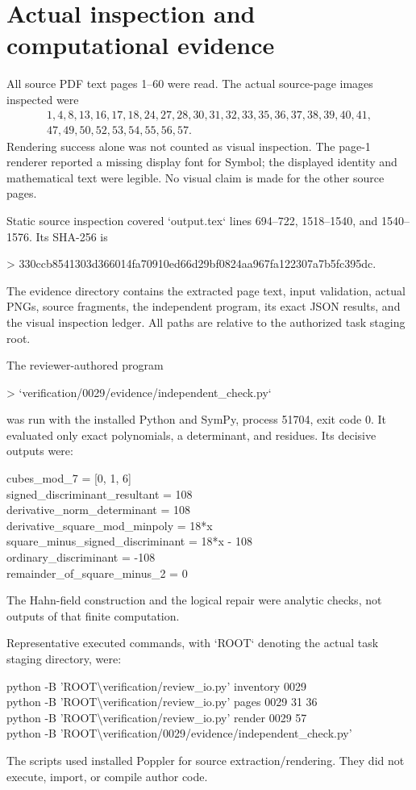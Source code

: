 \documentclass[10pt]{article}
\begin{document}
\section*{Actual inspection and computational evidence}
All source PDF text pages 1–60 were read. The actual source-page images inspected were \[\begin{gathered}
1,4,8,13,16,17,18,24,27,28,30,31,32,33,35,36,37,38,39,40,41,\\
47,49,50,52,53,54,55,56,57.
\end{gathered}\] Rendering success alone was not counted as visual inspection. The page-1 renderer reported a missing display font for Symbol; the displayed identity and mathematical text were legible. No visual claim is made for the other source pages.\par
Static source inspection covered `output.tex` lines 694–722, 1518–1540, and 1540–1576. Its SHA-256 is\par
> 330ccb8541303d366014fa70910ed66d29bf0824aa967fa122307a7b5fc395dc.\par
The evidence directory contains the extracted page text, input validation, actual PNGs, source fragments, the independent program, its exact JSON results, and the visual inspection ledger. All paths are relative to the authorized task staging root.\par
The reviewer-authored program\par
> `verification/0029/evidence/independent\_check.py`\par
was run with the installed Python and SymPy, process 51704, exit code 0. It evaluated only exact polynomials, a determinant, and residues. Its decisive outputs were:\par
{\ttfamily\footnotesize cubes\_mod\_7 = [0, 1, 6]\\
signed\_discriminant\_resultant = 108\\
derivative\_norm\_determinant = 108\\
derivative\_square\_mod\_minpoly = 18*x\\
square\_minus\_signed\_discriminant = 18*x - 108\\
ordinary\_discriminant = -108\\
remainder\_of\_square\_minus\_2 = 0}\par
The Hahn-field construction and the logical repair were analytic checks, not outputs of that finite computation.\par
Representative executed commands, with `ROOT` denoting the actual task staging directory, were:\par
{\ttfamily\footnotesize python -B 'ROOT\textbackslash{}verification/review\_io.py' inventory 0029\\
python -B 'ROOT\textbackslash{}verification/review\_io.py' pages 0029 31 36\\
python -B 'ROOT\textbackslash{}verification/review\_io.py' render 0029 57\\
python -B 'ROOT\textbackslash{}verification/0029/evidence/independent\_check.py'}\par
The scripts used installed Poppler for source extraction/rendering. They did not execute, import, or compile author code.\par
\end{document}

